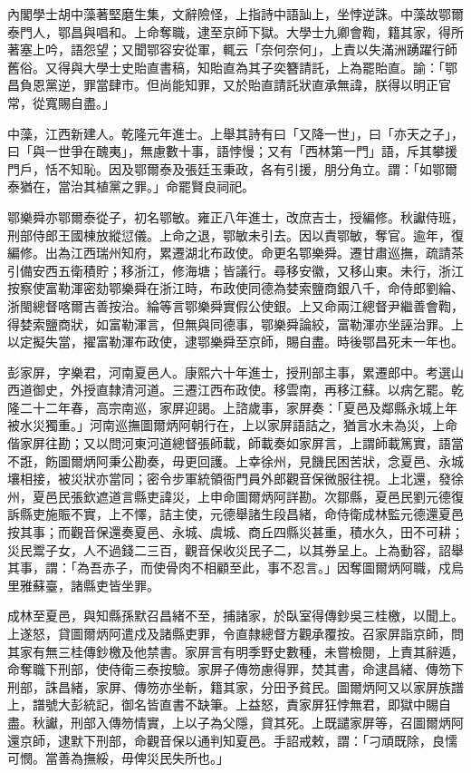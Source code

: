 \begin{pinyinscope}
內閣學士胡中藻著堅磨生集，文辭險怪，上指詩中語訕上，坐悖逆誅。中藻故鄂爾泰門人，鄂昌與唱和。上命奪職，逮至京師下獄。大學士九卿會鞫，籍其家，得所著塞上吟，語怨望；又聞鄂容安從軍，輒云「奈何奈何」，上責以失滿洲踴躍行師舊俗。又得與大學士史貽直書稿，知貽直為其子奕簪請託，上為罷貽直。諭：「鄂昌負恩黨逆，罪當肆市。但尚能知罪，又於貽直請託狀直承無諱，朕得以明正官常，從寬賜自盡。」

中藻，江西新建人。乾隆元年進士。上舉其詩有曰「又降一世」，曰「亦天之子」，曰「與一世爭在醜夷」，無慮數十事，語悖慢；又有「西林第一門」語，斥其攀援門戶，恬不知恥。因及鄂爾泰及張廷玉秉政，各有引援，朋分角立。謂：「如鄂爾泰猶在，當治其植黨之罪。」命罷賢良祠祀。

鄂樂舜亦鄂爾泰從子，初名鄂敏。雍正八年進士，改庶吉士，授編修。秋讞侍班，刑部侍郎王國棟放縱愆儀。上命之退，鄂敏未引去。因以責鄂敏，奪官。逾年，復編修。出為江西瑞州知府，累遷湖北布政使。命更名鄂樂舜。遷甘肅巡撫，疏請茶引備安西五衛積貯；移浙江，修海塘；皆議行。尋移安徽，又移山東。未行，浙江按察使富勒渾密劾鄂樂舜在浙江時，布政使同德為婪索鹽商銀八千，命侍郎劉綸、浙閩總督喀爾吉善按治。綸等言鄂樂舜實假公使銀。上又命兩江總督尹繼善會鞫，得婪索鹽商狀，如富勒渾言，但無與同德事，鄂樂舜論絞，富勒渾亦坐誣治罪。上以定擬失當，擢富勒渾布政使，逮鄂樂舜至京師，賜自盡。時後鄂昌死未一年也。

彭家屏，字樂君，河南夏邑人。康熙六十年進士，授刑部主事，累遷郎中。考選山西道御史，外授直隸清河道。三遷江西布政使。移雲南，再移江蘇。以病乞罷。乾隆二十二年春，高宗南巡，家屏迎謁。上諮歲事，家屏奏：「夏邑及鄰縣永城上年被水災獨重。」河南巡撫圖爾炳阿朝行在，上以家屏語詰之，猶言水未為災，上命偕家屏往勘；又以問河東河道總督張師載，師載奏如家屏言，上謂師載篤實，語當不誑，飭圖爾炳阿秉公勘奏，毋更回護。上幸徐州，見饑民困苦狀，念夏邑、永城壤相接，被災狀亦當同；密令步軍統領衙門員外郎觀音保微服往視。上北還，發徐州，夏邑民張欽遮道言縣吏諱災，上申命圖爾炳阿詳勘。次鄒縣，夏邑民劉元德復訴縣吏施賑不實，上不懌，詰主使，元德舉諸生段昌緒，命侍衛成林監元德還夏邑按其事；而觀音保還奏夏邑、永城、虞城、商丘四縣災甚重，積水久，田不可耕；災民鬻子女，人不過錢二三百，觀音保收災民子二，以其券呈上。上為動容，詔舉其事，謂：「為吾赤子，而使骨肉不相顧至此，事不忍言。」因奪圖爾炳阿職，戍烏里雅蘇臺，諸縣吏皆坐罪。

成林至夏邑，與知縣孫默召昌緒不至，捕諸家，於臥室得傳鈔吳三桂檄，以聞上。上遂怒，貸圖爾炳阿遣戍及諸縣吏罪，令直隸總督方觀承覆按。召家屏詣京師，問其家有無三桂傳鈔檄及他禁書。家屏言有明季野史數種，未嘗檢閱，上責其辭遁，命奪職下刑部，使侍衛三泰按驗。家屏子傳笏慮得罪，焚其書，命逮昌緒、傳笏下刑部，誅昌緒，家屏、傳笏亦坐斬，籍其家，分田予貧民。圖爾炳阿又以家屏族譜上，譜號大彭統記，御名皆直書不缺筆。上益怒，責家屏狂悖無君，即獄中賜自盡。秋讞，刑部入傳笏情實，上以子為父隱，貸其死。上既譴家屏等，召圖爾炳阿還京師，逮默下刑部，命觀音保以通判知夏邑。手詔戒敕，謂：「刁頑既除，良懦可憫。當善為撫綏，毋俾災民失所也。」


\end{pinyinscope}

